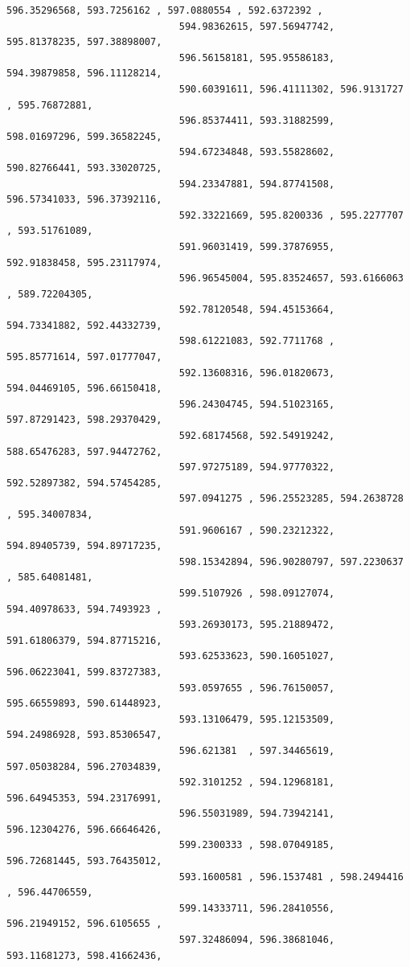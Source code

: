 \documentclass[11pt]{article}
\begin{document}
\begin{Verbatim}[commandchars=\\\{\}]
                              596.35296568, 593.7256162 , 597.0880554 , 592.6372392 ,
                              594.98362615, 597.56947742, 595.81378235, 597.38898007,
                              596.56158181, 595.95586183, 594.39879858, 596.11128214,
                              590.60391611, 596.41111302, 596.9131727 , 595.76872881,
                              596.85374411, 593.31882599, 598.01697296, 599.36582245,
                              594.67234848, 593.55828602, 590.82766441, 593.33020725,
                              594.23347881, 594.87741508, 596.57341033, 596.37392116,
                              592.33221669, 595.8200336 , 595.2277707 , 593.51761089,
                              591.96031419, 599.37876955, 592.91838458, 595.23117974,
                              596.96545004, 595.83524657, 593.6166063 , 589.72204305,
                              592.78120548, 594.45153664, 594.73341882, 592.44332739,
                              598.61221083, 592.7711768 , 595.85771614, 597.01777047,
                              592.13608316, 596.01820673, 594.04469105, 596.66150418,
                              596.24304745, 594.51023165, 597.87291423, 598.29370429,
                              592.68174568, 592.54919242, 588.65476283, 597.94472762,
                              597.97275189, 594.97770322, 592.52897382, 594.57454285,
                              597.0941275 , 596.25523285, 594.2638728 , 595.34007834,
                              591.9606167 , 590.23212322, 594.89405739, 594.89717235,
                              598.15342894, 596.90280797, 597.2230637 , 585.64081481,
                              599.5107926 , 598.09127074, 594.40978633, 594.7493923 ,
                              593.26930173, 595.21889472, 591.61806379, 594.87715216,
                              593.62533623, 590.16051027, 596.06223041, 599.83727383,
                              593.0597655 , 596.76150057, 595.66559893, 590.61448923,
                              593.13106479, 595.12153509, 594.24986928, 593.85306547,
                              596.621381  , 597.34465619, 597.05038284, 596.27034839,
                              592.3101252 , 594.12968181, 596.64945353, 594.23176991,
                              596.55031989, 594.73942141, 596.12304276, 596.66646426,
                              599.2300333 , 598.07049185, 596.72681445, 593.76435012,
                              593.1600581 , 596.1537481 , 598.2494416 , 596.44706559,
                              599.14333711, 596.28410556, 596.21949152, 596.6105655 ,
                              597.32486094, 596.38681046, 593.11681273, 598.41662436,

\end{Verbatim}
\end{document}
